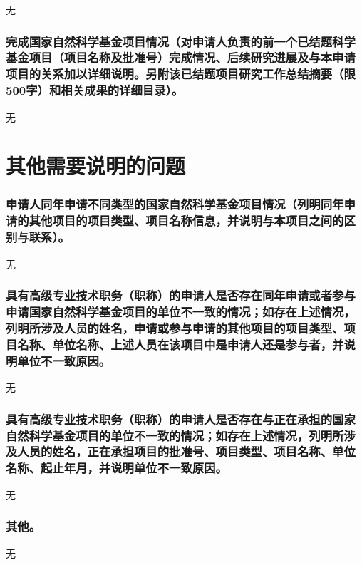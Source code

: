 \documentclass{article}
\begin{document}
无

\section[完成国家自然科学基金项目情况]
{\textbf{完成国家自然科学基金项目情况}（对申请人负责的前一个已结题科学基金项目（项目名称及批准号）完成情况、后续研究进展及与本申请项目的关系加以详细说明。另附该已结题项目研究工作总结摘要（限500字）和相关成果的详细目录）。}

无

\part{\textbf{其他需要说明的问题}}

\section{申请人同年申请不同类型的国家自然科学基金项目情况（列明同年申请的其他项目的项目类型、项目名称信息，并说明与本项目之间的区别与联系）。}

无

\section{具有高级专业技术职务（职称）的申请人是否存在同年申请或者参与申请国家自然科学基金项目的单位不一致的情况；如存在上述情况，列明所涉及人员的姓名，申请或参与申请的其他项目的项目类型、项目名称、单位名称、上述人员在该项目中是申请人还是参与者，并说明单位不一致原因。}

无

\section{具有高级专业技术职务（职称）的申请人是否存在与正在承担的国家自然科学基金项目的单位不一致的情况；如存在上述情况，列明所涉及人员的姓名，正在承担项目的批准号、项目类型、项目名称、单位名称、起止年月，并说明单位不一致原因。}

无

\section{其他。}

无
\end{document}
